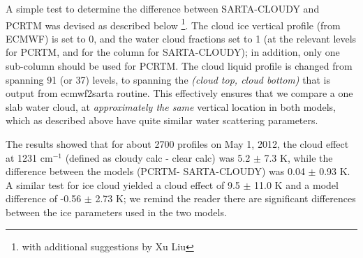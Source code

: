 \documentclass[11pt]{article}
\newcommand{\sasc}{\textsf{SARTA-CLOUDY}\xspace}
\newcommand{\pcrtm}{\textsf{PCRTM}\xspace}
\newcommand{\ecmwfXsarta}{\textsf{ecmwf2sarta}\xspace}
\newcommand{\ecmwf}{\textsf{ECMWF}\xspace}
\newcommand{\dfigure}[6]
{
\begin{figure}
  \begin{minipage}[t]{0.47\textwidth}
  \centering
  \texttt{[image: \#1]}
   \caption{#2}  \label{#3}
  \end{minipage}
  \hfil
  \begin{minipage}[t]{0.47\linewidth}
  \centering
  \texttt{[image: \#4]}
   \caption{#5}  \label{#6}
  \end{minipage}
\end{figure}
}
\newcommand{\wn}{cm$^{-1}$\xspace}
\begin{document}




A simple test to determine the difference between \sasc and \pcrtm was
devised as described below \footnote{with additional suggestions by Xu Liu}. 
The cloud ice vertical profile (from \ecmwf) is set to 0, and the 
water cloud fractions set to 1 (at the relevant levels for \pcrtm, and 
for the column for \sasc); in addition, only one sub-column should be used for 
\pcrtm. The cloud liquid profile is changed from spanning 
91 (or 37) levels, to spanning the {\em (cloud top, cloud bottom)} that is 
output from \ecmwfXsarta routine. This effectively ensures that we compare a 
one slab water cloud, at {\em approximately the same} vertical location in both models, 
which as described above have quite similar water scattering parameters.

The results showed that for
about 2700 profiles on May 1, 2012, the cloud effect at 1231 \wn 
(defined as cloudy calc - clear calc) was 5.2 $\pm$ 7.3 K, while
the difference between the models (\pcrtm - \sasc) was 0.04 $\pm$ 0.93 K.
A similar test for ice cloud yielded a cloud effect of 9.5 $\pm$ 11.0 K
and a model difference of -0.56 $\pm$ 2.73 K; we remind the reader 
there are significant differences 
between the ice parameters used in the two models.
\end{document}
